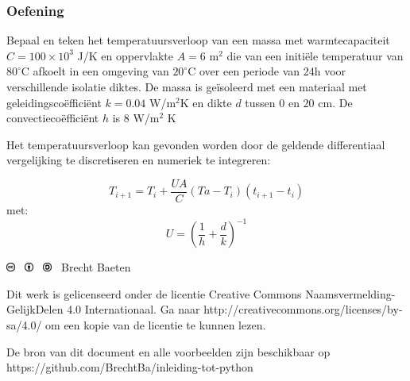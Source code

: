 \documentclass[t]{beamer}
\begin{document}
\begin{frame}
	\frametitle{Oefening}
Bepaal en teken het temperatuursverloop van een massa met warmtecapaciteit $C=100 \times 10^3$ J/K en oppervlakte $A = 6$ m$^2$ die van een initiële temperatuur van $80^\circ$C afkoelt in een omgeving van $20^\circ$C over een periode van 24h voor verschillende isolatie diktes. De massa is geïsoleerd met een materiaal met geleidingscoëfficiënt $k = 0.04$ W/m$^2$K en dikte $d$ tussen $0$ en $20$ cm. De convectiecoëfficiënt $h$ is $8$ W/m$^2$ K

	\vspace{0.5cm}
Het temperatuursverloop kan gevonden worden door de geldende differentiaal vergelijking te discretiseren en numeriek te integreren:

	\begin{equation}
		T_{i+1} = T_{i} + \frac{U A}{C} (Ta-T_{i}) (t_{i+1}-t_{i})
	\end{equation}	
met:
	\begin{equation}
		U = \left(\frac{1}{h} + \frac{d}{k} \right)^{-1}
	\end{equation}
\end{frame}  	
\begin{frame}
	\footnotesize
	\vspace{4cm}
	\includegraphics[height=0.3cm]{fig/cc} \
	\includegraphics[height=0.3cm]{fig/by} \
	\includegraphics[height=0.3cm]{fig/sa}
	\quad \the\year\ Brecht Baeten
	\vspace{0.5cm}
	
    Dit werk is gelicenseerd onder de licentie Creative Commons Naamsvermelding-GelijkDelen 4.0 Internationaal. Ga naar http://creativecommons.org/licenses/by-sa/4.0/ om een kopie van de licentie te kunnen lezen.
    	
    \vspace{0.5cm}
    De bron van dit document en alle voorbeelden zijn beschikbaar op https://github.com/BrechtBa/inleiding-tot-python
\end{frame}
\end{document}
